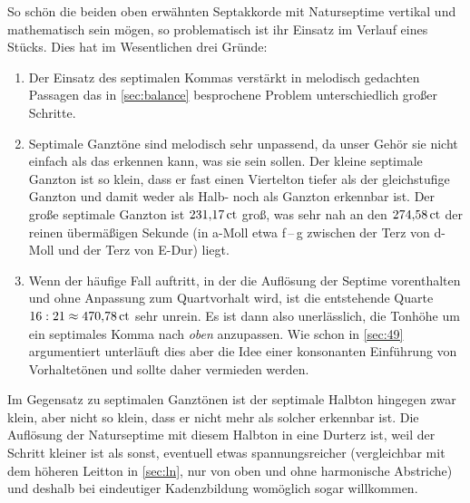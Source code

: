So schön die beiden oben erwähnten Septakkorde mit Naturseptime vertikal und
mathematisch sein mögen, so problematisch ist ihr Einsatz im Verlauf eines
Stücks. Dies hat im Wesentlichen drei Gründe:
\begin{enumerate}
\item Der Einsatz des septimalen Kommas verstärkt in melodisch gedachten
  Passagen das in \cref{sec:balance} besprochene Problem unterschiedlich großer
  Schritte.
\item Septimale Ganztöne sind melodisch sehr unpassend, da unser Gehör sie nicht
  einfach als das erkennen kann, was sie sein sollen. Der kleine septimale
  Ganzton ist so klein, dass er fast einen Viertelton tiefer als der
  gleichstufige Ganzton und damit weder als Halb- noch als Ganzton erkennbar
  ist. Der große septimale Ganzton ist $231{,}17\,\text{ct}$ groß, was sehr nah an den
  $274{,}58\,\text{ct}$ der reinen übermäßigen Sekunde (in a-Moll etwa \naturalp
  f\,–\,\sharpm g zwischen der Terz von d-Moll und der Terz von E-Dur)
  liegt.%
\item Wenn der häufige Fall auftritt, in der die Auflösung der Septime
  vorenthalten und ohne Anpassung zum Quartvorhalt wird, ist die entstehende
  Quarte $16:21 \approx 470{,}78\,\text{ct}$ sehr unrein.  Es ist dann also
  unerlässlich, die Tonhöhe um ein septimales Komma nach \emph{oben}
  anzupassen. Wie schon in \cref{sec:49} argumentiert unterläuft dies aber die
  Idee einer konsonanten Einführung von Vorhaltetönen und sollte daher vermieden
  werden.
\end{enumerate}
Im Gegensatz zu septimalen Ganztönen ist der septimale Halbton hingegen zwar
klein, aber nicht so klein, dass er nicht mehr als solcher erkennbar ist. Die
Auflösung der Naturseptime mit diesem Halbton in eine Durterz ist, weil der
Schritt kleiner ist als sonst, eventuell etwas spannungsreicher (vergleichbar
mit dem höheren Leitton in \cref{sec:ln}, nur von oben und ohne harmonische
Abstriche) und deshalb bei eindeutiger Kadenzbildung womöglich sogar willkommen.

